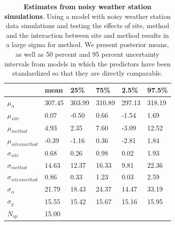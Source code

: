 \documentclass{article}\usepackage[]{graphicx}\usepackage[]{color}
\begin{document}
\begin{table}[ht]
\centering
\caption{\textbf{Estimates from noisy weather station simulations}. Using a model with noisy weather station data simulations and testing the effects of site, method and the interaction between site and method results in a large sigma for method. We present posterior means, as well as 50 percent and 95 percent uncertainty intervals from models in which the predictors have been standardized so that they are directly comparable.} 
\label{tab:noisyws}
\begingroup\footnotesize
\begin{tabular}{|p{}|p{}p{}p{}p{}p{}|}
  \hline
 & mean & 25\% & 75\% & 2.5\% & 97.5\% \\ 
  \hline
$\mu_{\alpha}$ & 307.45 & 303.99 & 310.89 & 297.13 & 318.19 \\ 
  $\mu_{site}$ & 0.07 & -0.50 & 0.66 & -1.54 & 1.69 \\ 
  $\mu_{method}$ & 4.93 & 2.35 & 7.60 & -3.09 & 12.52 \\ 
  $\mu_{sitexmethod}$ & -0.39 & -1.16 & 0.36 & -2.81 & 1.84 \\ 
  $\sigma_{site}$ & 0.68 & 0.26 & 0.98 & 0.02 & 1.93 \\ 
  $\sigma_{method}$ & 14.63 & 12.37 & 16.33 & 9.81 & 22.36 \\ 
  $\sigma_{sitexmethod}$ & 0.86 & 0.33 & 1.23 & 0.03 & 2.59 \\ 
  $\sigma_{\alpha}$ & 21.79 & 18.43 & 24.37 & 14.47 & 33.19 \\ 
  $\sigma_{y}$ & 15.55 & 15.42 & 15.67 & 15.16 & 15.95 \\ 
   \hline
$N_{sp}$ & 15.00 &  &  &  &  \\ 
   \hline
\end{tabular}
\endgroup
\end{table}
\end{document}
